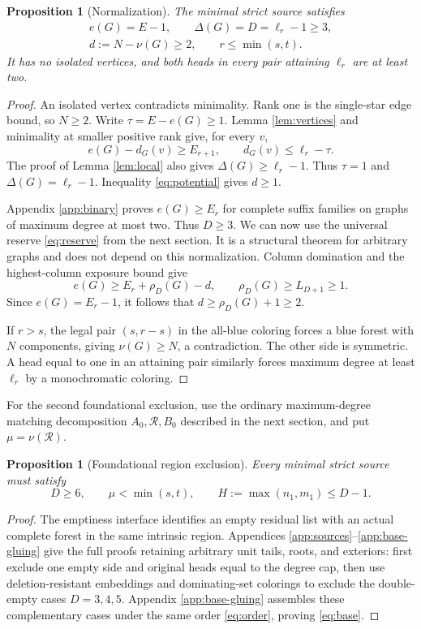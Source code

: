 \documentclass[11pt,a4paper]{article}
\newtheorem{proposition}[theorem]{Proposition}
\theoremstyle{definition}
\begin{document}
\begin{proposition}[Normalization]\label{prop:normal}
The minimal strict source satisfies
\begin{equation}\label{eq:normal}
\begin{gathered}
e(G)=E-1,\qquad \Delta(G)=D=\ell_r-1\ge3,\\
d:=N-\nu(G)\ge2,\qquad r\le\min(s,t).
\end{gathered}
\end{equation}
It has no isolated vertices, and both heads in every pair attaining $\ell_r$ are at least two.
\end{proposition}
\begin{proof}
An isolated vertex contradicts minimality. Rank one is the single-star edge bound, so $N\ge2$. Write $\tau=E-e(G)\ge1$. Lemma \ref{lem:vertices} and minimality at smaller positive rank give, for every $v$,
\[
e(G)-d_G(v)\ge E_{r+1},\qquad d_G(v)\le\ell_r-\tau.
\]
The proof of Lemma \ref{lem:local} also gives $\Delta(G)\ge\ell_r-1$. Thus $\tau=1$ and $\Delta(G)=\ell_r-1$. Inequality \eqref{eq:potential} gives $d\ge1$.

Appendix \ref{app:binary} proves $e(G)\ge E_r$ for complete suffix families on graphs of maximum degree at most two. Thus $D\ge3$. We can now use the universal reserve \eqref{eq:reserve} from the next section. It is a structural theorem for arbitrary graphs and does not depend on this normalization. Column domination and the highest-column exposure bound give
\[
e(G)\ge E_r+\rho_D(G)-d,\qquad \rho_D(G)\ge L_{D+1}\ge1.
\]
Since $e(G)=E_r-1$, it follows that $d\ge\rho_D(G)+1\ge2$.

If $r>s$, the legal pair $(s,r-s)$ in the all-blue coloring forces a blue forest with $N$ components, giving $\nu(G)\ge N$, a contradiction. The other side is symmetric. A head equal to one in an attaining pair similarly forces maximum degree at least $\ell_r$ by a monochromatic coloring.
\end{proof}

For the second foundational exclusion, use the ordinary maximum-degree matching decomposition $A_0,\mathcal R,B_0$ described in the next section, and put $\mu=\nu(\mathcal R)$.
\begin{proposition}[Foundational region exclusion]\label{prop:base}
Every minimal strict source must satisfy
\begin{equation}\label{eq:base}
D\ge6,\qquad \mu<\min(s,t),\qquad H:=\max(n_1,m_1)\le D-1.
\end{equation}
\end{proposition}
\begin{proof}
The emptiness interface identifies an empty residual list with an actual complete forest in the same intrinsic region. Appendices \ref{app:sources}--\ref{app:base-gluing} give the full proofs retaining arbitrary unit tails, roots, and exteriors: first exclude one empty side and original heads equal to the degree cap, then use deletion-resistant embeddings and dominating-set colorings to exclude the double-empty cases $D=3,4,5$. Appendix \ref{app:base-gluing} assembles these complementary cases under the same order \eqref{eq:order}, proving \eqref{eq:base}.
\end{proof}
\end{document}

